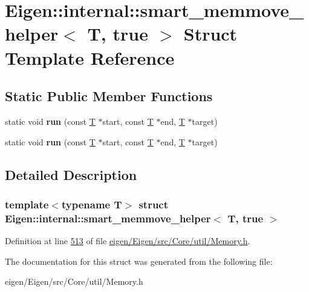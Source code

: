 \hypertarget{struct_eigen_1_1internal_1_1smart__memmove__helper_3_01_t_00_01true_01_4}{}\section{Eigen\+:\+:internal\+:\+:smart\+\_\+memmove\+\_\+helper$<$ T, true $>$ Struct Template Reference}
\label{struct_eigen_1_1internal_1_1smart__memmove__helper_3_01_t_00_01true_01_4}
\subsection*{Static Public Member Functions}
\begin{DoxyCompactItemize}
\item 
\mbox{\label{struct_eigen_1_1internal_1_1smart__memmove__helper_3_01_t_00_01true_01_4_a34f6b783caad68de6b232f505bc74dde}} 
static void {\bfseries run} (const \hyperlink{group___sparse_core___module}{T} $\ast$start, const \hyperlink{group___sparse_core___module}{T} $\ast$end, \hyperlink{group___sparse_core___module}{T} $\ast$target)
\item 
\mbox{\label{struct_eigen_1_1internal_1_1smart__memmove__helper_3_01_t_00_01true_01_4_a34f6b783caad68de6b232f505bc74dde}} 
static void {\bfseries run} (const \hyperlink{group___sparse_core___module}{T} $\ast$start, const \hyperlink{group___sparse_core___module}{T} $\ast$end, \hyperlink{group___sparse_core___module}{T} $\ast$target)
\end{DoxyCompactItemize}


\subsection{Detailed Description}
\subsubsection*{template$<$typename T$>$\newline
struct Eigen\+::internal\+::smart\+\_\+memmove\+\_\+helper$<$ T, true $>$}



Definition at line \hyperlink{eigen_2_eigen_2src_2_core_2util_2_memory_8h_source_l00513}{513} of file \hyperlink{eigen_2_eigen_2src_2_core_2util_2_memory_8h_source}{eigen/\+Eigen/src/\+Core/util/\+Memory.\+h}.



The documentation for this struct was generated from the following file\+:\begin{DoxyCompactItemize}
\item 
eigen/\+Eigen/src/\+Core/util/\+Memory.\+h\end{DoxyCompactItemize}

